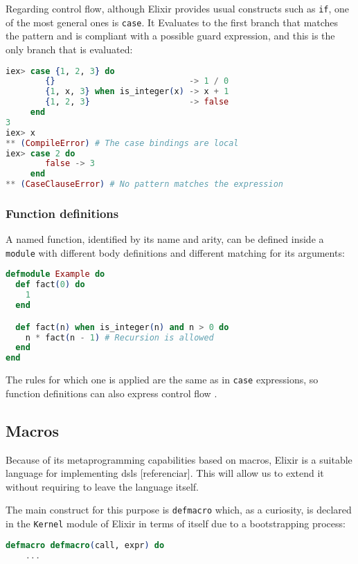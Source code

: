 Regarding control flow, although Elixir provides usual constructs such as 
\verb|if|, one of the most general ones is \verb|case|. It Evaluates to 
the first branch that matches the pattern and is compliant with a possible
guard expression, and this is the only branch that is evaluated:

\begin{lstlisting}[language=elixir,numbers=none,frame=none]
iex> case {1, 2, 3} do 
        {}                           -> 1 / 0
        {1, x, 3} when is_integer(x) -> x + 1
        {1, 2, 3}                    -> false
     end
3
iex> x
** (CompileError) # The case bindings are local
iex> case 2 do 
        false -> 3 
     end 
** (CaseClauseError) # No pattern matches the expression
\end{lstlisting}

\subsubsection{Function definitions}

A named function, identified by its name and arity, can be defined inside 
a \verb|module| with different body definitions and different matching for
its arguments:

\begin{lstlisting}[language=elixir,numbers=none,frame=none]
defmodule Example do 
  def fact(0) do 
    1
  end

  def fact(n) when is_integer(n) and n > 0 do 
    n * fact(n - 1) # Recursion is allowed
  end
end
\end{lstlisting}

The rules for which one is applied are the same as in \verb|case| expressions,
so function definitions can also express control flow \citep{programmingElixir}.

\subsection{Macros}

Because of its metaprogramming capabilities based on macros, Elixir is a suitable
language for implementing \gls{dsl}s [referenciar]. This will allow us to extend 
it without requiring to leave the language itself.

The main construct for this purpose is \verb|defmacro| which, as a curiosity,
is declared in the \verb|Kernel| module of Elixir in terms of itself due to 
a bootstrapping process:

\begin{lstlisting}[language=elixir,numbers=none,frame=none]
  defmacro defmacro(call, expr) do
    ...
\end{lstlisting}

